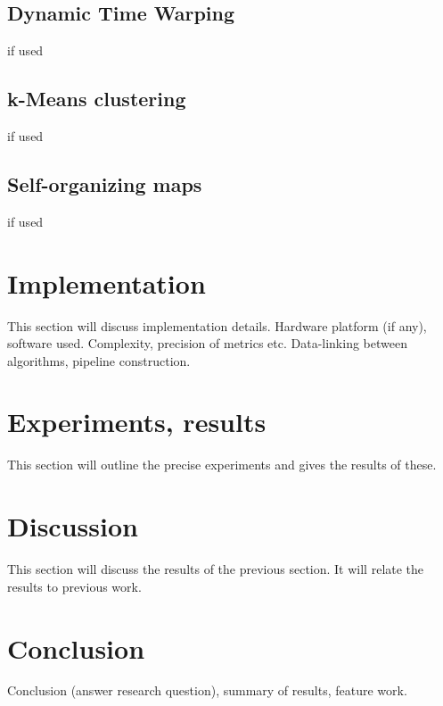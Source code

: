 \documentclass[a4paper,10pt]{extarticle}
\begin{document}
  \subsection{Dynamic Time Warping}
  if used

  \subsection{k-Means clustering}
  if used

  \subsection{Self-organizing maps}
  if used


\section{Implementation}
\label{sec:Implementation}
This section will discuss implementation details.
Hardware platform (if any), software used. Complexity, precision of metrics etc.
Data-linking between algorithms, pipeline construction.

\section{Experiments, results}
\label{sec:Experiments}
This section will outline the precise experiments and gives the results of these.

\section{Discussion}
\label{sec:Discussion}
This section will discuss the results of the previous section.
It will relate the results to previous work.

\section{Conclusion}
\label{sec:Conclusion}
Conclusion (answer research question), summary of results, feature work.
\end{document}
